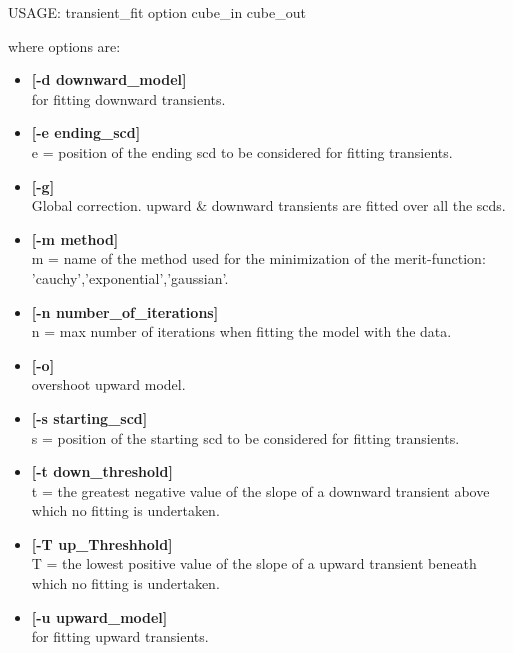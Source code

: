 \begin{center}
 USAGE: transient\_fit option cube\_in cube\_out
\end{center}
where options are:
\begin{itemize}
\item {\bf [-d downward\_model]} \\
for fitting downward transients.
\item {\bf [-e ending\_scd]} \\
e = position of the ending scd to be considered  for fitting transients.
\item {\bf [-g]} \\
Global correction. upward \& downward transients are fitted over all the scds.
 \item {\bf [-m method]} \\
m = name of the method used for the minimization of the merit-function:
'cauchy','exponential','gaussian'.
\item {\bf [-n number\_of\_iterations]} \\
n = max number of iterations when fitting the model with the data.
\item {\bf [-o]} \\
overshoot upward model.
\item {\bf [-s starting\_scd]} \\
s = position of the starting scd to be considered  for fitting transients.
\item {\bf [-t down\_threshold]} \\
t = the greatest negative value of the slope of a downward transient above 
which   no fitting is undertaken.
\item {\bf [-T up\_Threshhold]} \\
T = the lowest positive value of the slope of a upward transient beneath
 which no fitting is undertaken.
\item {\bf [-u upward\_model]} \\
for fitting upward transients.
\end{itemize}

